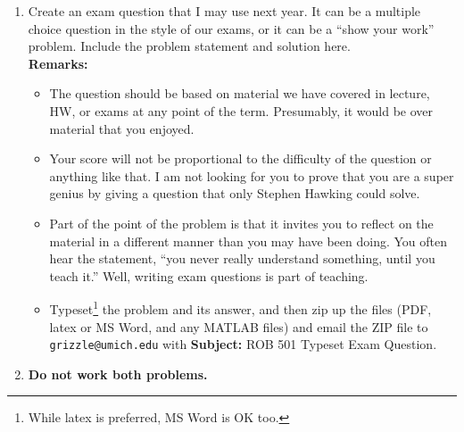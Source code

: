 \documentclass[letterpaper]{article}
\begin{document}
\begin{enumerate}
\item Create an exam question that I may use next year. It can be a multiple choice question in the style of our exams, or it can be a ``show your work'' problem. Include the problem statement and solution here.  \\

\textbf{Remarks:}
\begin{itemize}

\item The question should be based on material we have covered in lecture, HW, or exams at any point of the term. Presumably, it would be over material that you enjoyed.
\item Your score will not be proportional to the difficulty of the question or anything like that. I am not looking for you to prove that you are a super genius by giving a question that only Stephen Hawking could solve.
 \item Part of the point of the problem is that it invites you to reflect on the material in a different manner than you may have been doing. You often hear the statement, ``you never really understand something, until you teach it.'' Well, writing exam questions is part of teaching.

     \item  Typeset\footnote{While latex is preferred, MS Word is OK too.} the problem and its answer, and then zip up the files (PDF, latex or MS Word, and any MATLAB files) and email the ZIP file to \texttt{grizzle@umich.edu} with \textbf{Subject:} ROB 501 Typeset Exam Question. \\
\end{itemize}

\item[ ] \textbf{Do not work both problems.}

\end{enumerate}
\end{document}
